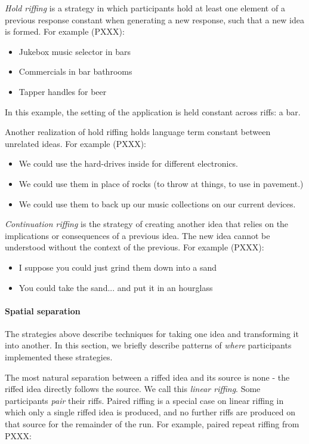 \emph{Hold riffing} is a strategy in which participants hold at least one element of a previous response constant when generating a new response, such that a new idea is formed. For example (PXXX):

\begin{itemize}
    \item Jukebox music selector in bars
    \item Commercials in bar bathrooms 
    \item Tapper handles for beer 
\end{itemize}

In this example, the setting of the application is held constant across riffs: a bar.

Another realization of hold riffing holds language term constant between unrelated ideas. For example (PXXX):

\begin{itemize}
    \item We could use the hard-drives inside for different electronics.
    \item We could use them in place of rocks (to throw at things, to use in pavement.)
    \item We could use them to back up our music collections on our current devices.
\end{itemize}

\emph{Continuation riffing} is the strategy of creating another idea that relies on the implications or consequences of a previous idea. The new idea cannot be understood without the context of the previous. For example (PXXX):

\begin{itemize}
    \item I suppose you could just grind them down into a sand
    \item You could take the sand... and put it in an hourglass
\end{itemize}

\paragraph{Spatial separation}

The strategies above describe techniques for taking one idea and transforming it into another. In this section, we briefly describe patterns of \emph{where} participants implemented these strategies.

The most natural separation between a riffed idea and its source is none - the riffed idea directly follows the source. We call this \emph{linear riffing}. Some participants \emph{pair} their riffs. Paired riffing is a special case on linear riffing in which only a single riffed idea is produced, and no further riffs are produced on that source for the remainder of the run. For example, paired repeat riffing from PXXX:

